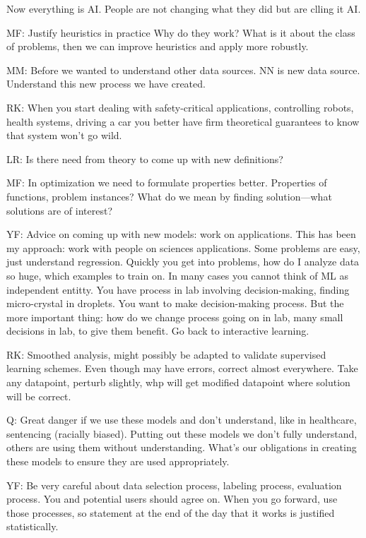  Now everything is AI. People are not changing what they did but are clling it AI.
 
MF:  Justify heuristics in practice Why do they work? What is it about the class of problems, then we can improve heuristics and apply more robustly.

MM: Before we wanted to understand other data sources. NN is new data source. Understand this new process we have created. 

RK: When you start dealing with safety-critical applications, controlling robots, health systems, driving a car you better have firm theoretical guarantees to know that system won't go wild.

LR: Is there need from theory to come up with new definitions? 

MF: In optimization we need to formulate properties better. Properties of functions, problem instances? What do we mean by finding solution---what solutions are of interest?

YF: Advice on coming up with new models: work on applications. This has been my approach: work with people on sciences applications. Some problems are easy, just understand regression. Quickly you get into problems, how do I analyze data so huge, which examples to train on. In many cases you cannot think of ML as independent entitty. You have process in lab involving decision-making, finding micro-crystal in droplets. You want to make decision-making process. But the more important thing: how do we change process going on in lab, many small decisions in lab, to give them benefit. Go back to interactive learning.

RK: Smoothed analysis, might possibly be adapted to validate supervised learning schemes. Even though may have errors, correct almost everywhere. Take any datapoint, perturb slightly, whp will get modified datapoint where solution will be correct. 

Q: Great danger if we use these models and don't understand, like in healthcare, sentencing (racially biased). Putting out these models we don't fully understand, others are using them without understanding. What's our obligations in creating these models to ensure they are used appropriately.

YF: Be very careful about data selection process, labeling process, evaluation process. You and potential users should agree on. When you go forward, use those processes, so statement at the end of the day that it works is justified statistically.

